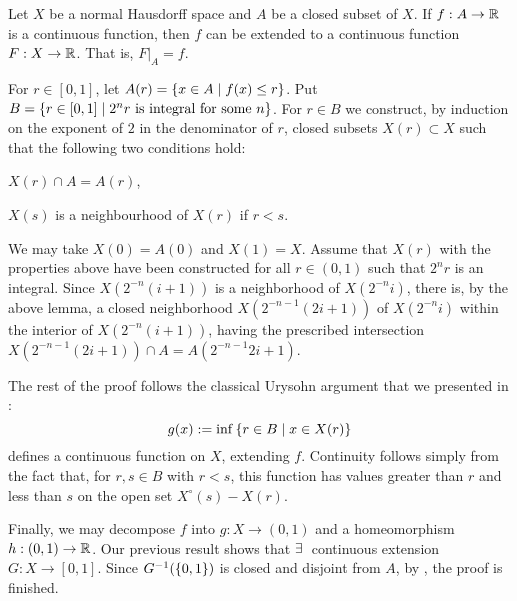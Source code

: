\begin{theorem}
    Let $X$ be a normal Hausdorff space and $A$ be a 
    closed subset of $X$. If $f:A\to\mathbb{R}$ is a continuous 
    function, then $f$ can be extended to a continuous 
    function $F:X\to\mathbb{R}$. That is, $F|_A = f$. 
\end{theorem}
\begin{pf}
    For $r\in[0,1]$, let $A(r) = \left\{ {x\in A\mid f(x)\leq r} \right\}$. 
    Put $B = \left\{ r\in[0, 1] \;\middle\vert\; 2^nr\text{ is integral for some }n \right\}$.
    For $r \in B$ we construct, by induction on the exponent of 
    $2$ in the denominator of $r$, closed subsets $X(r)\subset X$ 
    such that the following two conditions hold:
    \begin{thmenum}
        \item $X(r) \cap A = A(r)$,
        \item $X(s)$ is a neighbourhood of $X(r)$ if $r < s$.
    \end{thmenum}
    We may take $X(0)=A(0) $ and $X(1)=X$. Assume that $X(r)$ 
    with the properties above have been constructed for all 
    $r\in(0,1)$ such that $2^nr$ is an integral. Since 
    $X(2^{-n}(i+1))$ is a neighborhood of $ X(2^{-n}i)$, 
    there is, by the above lemma, a closed neighborhood 
    $X(2^{-n-1}(2i+1))$ of $ X(2^{-n}i) $ within the interior 
    of $X(2^{-n}(i+1))$, having the prescribed intersection 
    $X(2^{-n-1}(2i+1)) \cap A = A(2^{-n-1}2i + 1)$.

    The rest of the proof follows the classical Urysohn argument
    that we presented in :
    \[
        g(x) := \inf \left\{ r\in B \;\middle\vert\; x\in X(r) \right\}
    \]
    defines a continuous function on $X$, extending $f$. 
    Continuity follows simply from the fact that, for 
    $r,s\in B$ with $r<s$, this function has values greater 
    than $r$ and less than $s$ on the open set 
    $X^\circ(s)-X(r)$. 

    Finally, we may decompose $f$ into $g: X\to (0,1)$ and a 
    homeomorphism $h: (0,1)\to\mathbb{R}$. Our previous result shows 
    that $\exists\:$ continuous extension $G:X\to[0,1]$. Since 
    $G^{-1}(\left\{ {0,1} \right\})$ is closed and disjoint from $A$, by 
    , the proof is finished.
\end{pf}